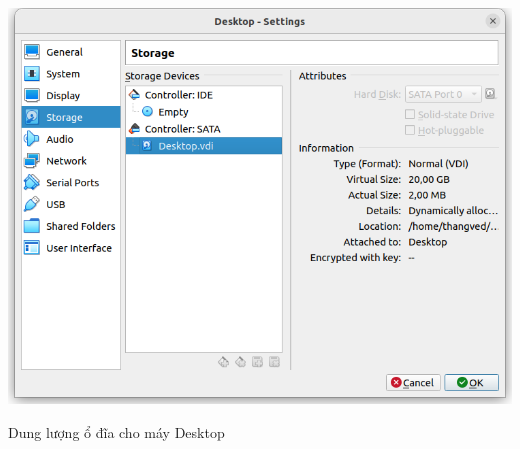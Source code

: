 \documentclass[a4paper, 11pt]{article}
\begin{document}
\begin{itemize}
\begin{enumerate}
                    \begin{minipage}
                        {\linewidth}
                        \captionsetup{type=figure}
                        \centering
                        \includegraphics[width=\linewidth]{images/desktop-disk.png}
                        \caption{Dung lượng ổ đĩa cho máy Desktop}
                        \label{figure:desktop-disk}
                    \end{minipage}


\end{enumerate}
\end{itemize}
\end{document}
